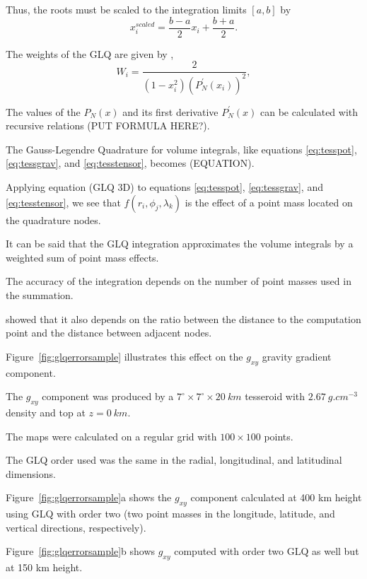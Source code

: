 \documentclass[paper,twocolumn]{geophysics}
\begin{document}
Thus, the roots must be scaled to the integration limits $[a, b]$ by
\begin{equation}
    x^{scaled}_i = \frac{b - a}{2} x_i + \frac{b + a}{2}.
\end{equation}

The weights of the GLQ are given by \citep{Hildebrand1987},
\begin{equation}
    W_i = \frac{2}{(1 - x_i^2)(P^\prime_N(x_i))^2},
\end{equation}

The values of the $P_N(x)$ and its first derivative $P^\prime_N(x)$ can be
calculated with recursive relations (PUT FORMULA HERE?).

The Gauss-Legendre Quadrature for volume integrals, like equations
\ref{eq:tesspot}, \ref{eq:tessgrav}, and \ref{eq:tesstensor},
becomes \citep{Asgharzadeh2007} (EQUATION).

Applying equation (GLQ 3D) to equations
\ref{eq:tesspot}, \ref{eq:tessgrav}, and \ref{eq:tesstensor},
we see that $f(r_i, \phi_j, \lambda_k)$ is the effect of a point
mass located on the quadrature nodes.

It can be said that the GLQ integration approximates the volume integrals  by a
weighted sum of point mass effects.


The accuracy of the integration
depends on the number of point masses used in the summation.

\citet{Ku1977} showed that it also depends on the ratio between
the distance to the computation point and the distance between adjacent nodes.

Figure~\ref{fig:glqerrorsample}
illustrates this effect on the $g_{xy}$ gravity gradient component.

The $g_{xy}$ component was produced by a
$7^\circ \times 7^\circ \times 20\ km$ tesseroid
with $2.67\ g.cm^{-3}$ density
and top at $z=0\ km$.

The maps were calculated on a regular grid
with $100\times100$ points.

The GLQ order used was the same
in the radial, longitudinal, and latitudinal dimensions.

Figure~\ref{fig:glqerrorsample}a shows the $g_{xy}$ component
calculated at 400 km height using
GLQ with order two (two point masses in the longitude, latitude, and vertical
directions, respectively).

Figure~\ref{fig:glqerrorsample}b shows $g_{xy}$ computed with order two
GLQ as well but at 150 km height.
\end{document}
